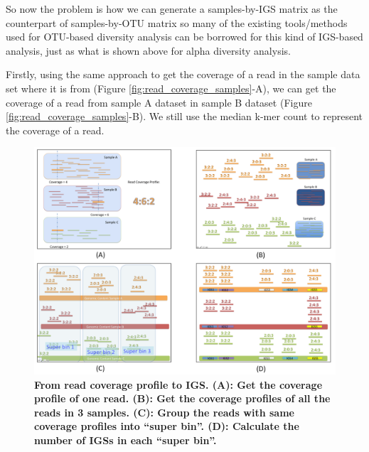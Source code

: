     
So now the problem is how we can generate a samples-by-IGS matrix as 
the counterpart of samples-by-OTU matrix so many of the existing 
tools/methods used for OTU-based diversity analysis can be borrowed for this kind 
of IGS-based analysis, just as what is shown above for alpha diversity analysis.

Firstly, using the same approach to get the coverage of a read in the sample data set where it is from 
(Figure \ref{fig:read_coverage_samples}-A), we can get the coverage of a read from sample A dataset in 
 sample B dataset (Figure \ref{fig:read_coverage_samples}-B). We still use the median k-mer count to represent 
the coverage of a read.  

\begin{figure}[!ht]
 \centerline{\includegraphics[width=7in]{./figures/coverage_profile.png}}
 \caption{\bf From read coverage profile to IGS. (A): Get the coverage profile of one read. (B): Get the coverage
 profiles of all the reads in 3 samples. (C): Group the reads with same coverage profiles into ``super bin''. 
 (D): Calculate the number of IGSs in each ``super bin''.}
\label{fig:coverage_profile}
\end{figure}

